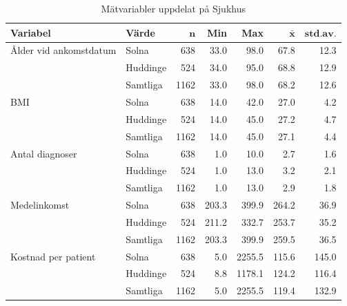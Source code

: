 \begin{table}[htbp]
\centering
\caption{Mätvariabler uppdelat på Sjukhus} 
\label{tab:sh1}
{\footnotesize
\begin{tabular}{llrrrrr}
 \textbf{Variabel} & \textbf{Värde} & $\mathbf{n}$ & \textbf{Min} & \textbf{Max} & $\mathbf{\bar{x}}$ & $\mathbf{std.av.}$ \\ 
  \hline
Ålder vid ankomstdatum & Solna &  638 &  33.0 &   98.0 &  67.8 &  12.3 \\ 
   & Huddinge &  524 &  34.0 &   95.0 &  68.8 &  12.9 \\ 
   \hline
 & Samtliga & 1162 &  33.0 &   98.0 &  68.2 &  12.6 \\ 
   \hline
BMI & Solna &  638 &  14.0 &   42.0 &  27.0 &   4.2 \\ 
   & Huddinge &  524 &  14.0 &   45.0 &  27.2 &   4.7 \\ 
   \hline
 & Samtliga & 1162 &  14.0 &   45.0 &  27.1 &   4.4 \\ 
   \hline
Antal diagnoser & Solna &  638 &   1.0 &   10.0 &   2.7 &   1.6 \\ 
   & Huddinge &  524 &   1.0 &   13.0 &   3.2 &   2.1 \\ 
   \hline
 & Samtliga & 1162 &   1.0 &   13.0 &   2.9 &   1.8 \\ 
   \hline
Medelinkomst & Solna &  638 & 203.3 &  399.9 & 264.2 &  36.9 \\ 
   & Huddinge &  524 & 211.2 &  332.7 & 253.7 &  35.2 \\ 
   \hline
 & Samtliga & 1162 & 203.3 &  399.9 & 259.5 &  36.5 \\ 
   \hline
Kostnad per patient & Solna &  638 &   5.0 & 2255.5 & 115.6 & 145.0 \\ 
   & Huddinge &  524 &   8.8 & 1178.1 & 124.2 & 116.4 \\ 
   \hline
 & Samtliga & 1162 &   5.0 & 2255.5 & 119.4 & 132.9 \\ 
   \hline
\end{tabular}
}

\end{table}

